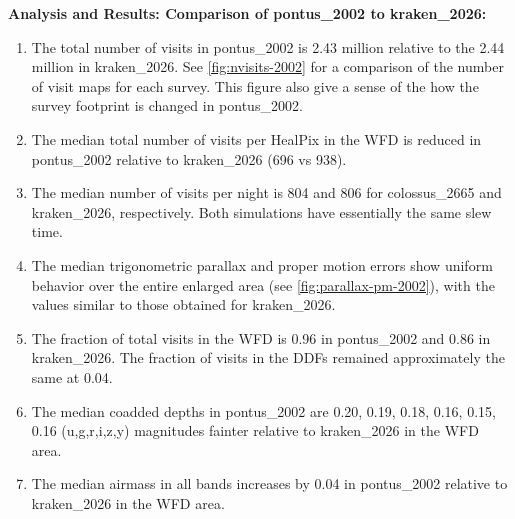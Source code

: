 \documentclass[DM,authoryear,toc]{lsstdoc}
\begin{document}
\textbf{Analysis and Results: Comparison of pontus\_2002 to kraken\_2026:}

\begin{enumerate}
\item The total number of visits in pontus\_2002 is 2.43 million relative to the 2.44 million in kraken\_2026. See \autoref{fig:nvisits-2002}
for a comparison of the number of visit maps for each survey. This figure also give a sense of the how the survey footprint is changed
in pontus\_2002.
\item The median total number of visits per HealPix in the WFD is reduced in pontus\_2002 relative to kraken\_2026 (696 vs 938).
\item The median number of visits per night is 804 and 806 for colossus\_2665 and kraken\_2026, respectively.
Both simulations have essentially the same slew time.
\item The median trigonometric parallax and proper motion errors show uniform behavior over the entire enlarged area
(see \autoref{fig:parallax-pm-2002}), with the values similar to those obtained for kraken\_2026.
\item The fraction of total visits in the WFD is 0.96 in pontus\_2002 and 0.86 in kraken\_2026. The fraction of visits
in the DDFs remained approximately the same at 0.04.
\item The median coadded depths in pontus\_2002 are 0.20, 0.19, 0.18, 0.16, 0.15, 0.16 (u,g,r,i,z,y) magnitudes fainter relative
to kraken\_2026 in the WFD area.
\item The median airmass in all bands increases by 0.04 in pontus\_2002 relative to kraken\_2026 in the WFD area.
\end{enumerate}
\end{document}
